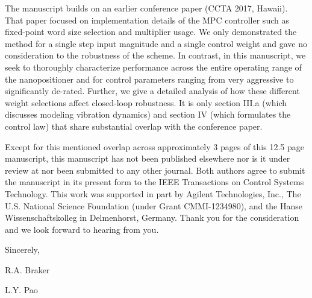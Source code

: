 \documentclass[a4paper,twoside]{article}
\begin{document}
The manuscript builds on an earlier conference paper (CCTA 2017, Hawaii). That paper focused on implementation details of the MPC controller such as fixed-point word size selection and multiplier usage. We only demonstrated the method for a single step input magnitude and a single control weight and gave no consideration to the robustness of the scheme. In contrast, in this manuscript, we seek to thoroughly characterize performance across the entire operating range of the nanopositioner and for control parameters ranging from very aggressive to significantly de-rated. Further, we give a detailed analysis of how these different weight selections affect closed-loop robustness. It is only section III.a (which discusses modeling vibration dynamics) and section IV (which formulates the control law) that share substantial overlap with the conference paper.

Except for this mentioned overlap across approximately 3 pages of this 12.5 page manuscript, this manuscript has not been published elsewhere nor is it under review at nor been submitted to any other journal. Both authors agree to submit the manuscript in its present form to the IEEE Transactions on Control Systems Technology. This work was supported in part by Agilent Technologies, Inc., The U.S. National Science Foundation (under Grant CMMI-1234980), and the Hanse Wissenschaftskolleg in Delmenhorst, Germany. Thank you for the consideration and we look forward to hearing from you.

\par\bigskip
\noindent Sincerely,
\par\bigskip
\noindent R.A. Braker\par
\noindent L.Y. Pao
\end{document}
